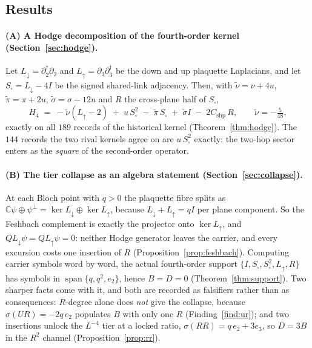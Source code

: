 \documentclass[11pt]{article}
\theoremstyle{definition}
\theoremstyle{remark}
\newcommand{\dg}{^{\dagger}}
\newcommand{\Ldn}{L_{\downarrow}}
\newcommand{\Lup}{L_{\uparrow}}
\newcommand{\Ssq}{S_{\square}}
\newcommand{\C}{\mathbb{C}}
\begin{document}
\subsection{Results}

\paragraph{(A) A Hodge decomposition of the fourth-order kernel
(Section~\ref{sec:hodge}).}
Let $\Ldn=\partial_2\dg\partial_2$ and $\Lup=\partial_3\partial_3\dg$ be the
down and up plaquette Laplacians, and let $\Ssq=\Ldn-4I$ be the signed
shared-link adjacency. Then, with $\tilde\nu=\nu+4u$, $\tilde\pi=\pi+2u$,
$\tilde\sigma=\sigma-12u$ and $R$ the cross-plane half of $\Ssq$,
\[
  H_4 \;=\; -\tilde\nu(\Lup-2)\;+\;u\,\Ssq^2\;-\;\tilde\pi\,\Ssq\;+\;\tilde\sigma I
        \;-\;2C_{\mathrm{shp}}\,R ,\qquad \tilde\nu=-\tfrac{5}{48},
\]
exactly on all $189$ records of the historical kernel (Theorem~\ref{thm:hodge}).
The $144$ records the two rival kernels agree on are $u\,\Ssq^2$ exactly: the
two-hop sector enters as the \emph{square} of the second-order operator.

\paragraph{(B) The tier collapse as an algebra statement
(Section~\ref{sec:collapse}).}
At each Bloch point with $q>0$ the plaquette fibre splits as
$\C\psi\oplus\psi^\perp=\ker\Ldn\oplus\ker\Lup$, because $\Ldn+\Lup=qI$ per
plane component. So the Feshbach complement is exactly the projector onto
$\ker\Lup$, and $Q\Ldn\psi=Q\Lup\psi=0$: neither Hodge generator leaves the
carrier, and every excursion costs one insertion of $R$
(Proposition~\ref{prop:feshbach}). Computing carrier symbols word by word,
the actual fourth-order support $\{I,\Ssq,\Ssq^2,\Lup,R\}$ has symbols in
$\operatorname{span}\{q,q^2,e_2\}$, hence $B=D=0$ (Theorem~\ref{thm:support}).
Two sharper facts come with it, and both are recorded as falsifiers rather than
as consequences: $R$-degree alone does \emph{not} give the collapse, because
$\sigma(UR)=-2q\,e_2$ populates $B$ with only one $R$
(Finding~\ref{find:ur}); and two insertions unlock the $L^{-4}$ tier at a
locked ratio, $\sigma(RR)=q\,e_2+3e_3$, so $D=3B$ in the $R^2$ channel
(Proposition~\ref{prop:rr}).
\end{document}
